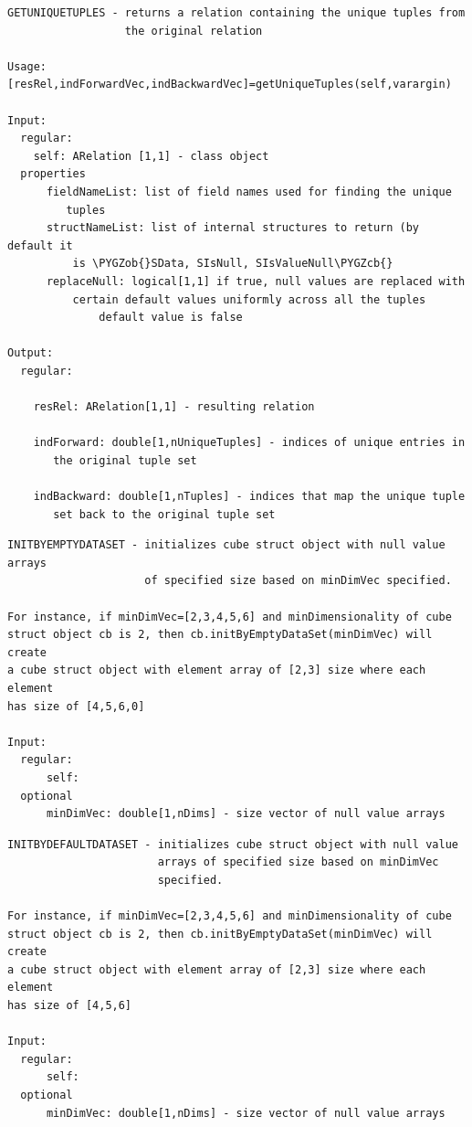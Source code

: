 \documentclass[letterpaper,10pt,english]{sphinxmanual}
\def\PYGZob{\char`\{}
\def\PYGZcb{\char`\}}
\begin{document}
\begin{Verbatim}[commandchars=\\\{\}]
GETUNIQUETUPLES - returns a relation containing the unique tuples from
                  the original relation

Usage: [resRel,indForwardVec,indBackwardVec]=getUniqueTuples(self,varargin)

Input:
  regular:
    self: ARelation [1,1] - class object
  properties
      fieldNameList: list of field names used for finding the unique
         tuples
      structNameList: list of internal structures to return (by default it
          is \PYGZob{}SData, SIsNull, SIsValueNull\PYGZcb{}
      replaceNull: logical[1,1] if true, null values are replaced with
          certain default values uniformly across all the tuples
              default value is false

Output:
  regular:

    resRel: ARelation[1,1] - resulting relation

    indForward: double[1,nUniqueTuples] - indices of unique entries in
       the original tuple set

    indBackward: double[1,nTuples] - indices that map the unique tuple
       set back to the original tuple set
\end{Verbatim}
\label{chap_func:smartdb-relations-atypifiedstaticrelation-initbyemptydataset}
\begin{Verbatim}[commandchars=\\\{\}]
INITBYEMPTYDATASET - initializes cube struct object with null value arrays
                     of specified size based on minDimVec specified.

For instance, if minDimVec=[2,3,4,5,6] and minDimensionality of cube
struct object cb is 2, then cb.initByEmptyDataSet(minDimVec) will create
a cube struct object with element array of [2,3] size where each element
has size of [4,5,6,0]

Input:
  regular:
      self:
  optional
      minDimVec: double[1,nDims] - size vector of null value arrays
\end{Verbatim}
\label{chap_func:smartdb-relations-atypifiedstaticrelation-initbydefaultdataset}
\begin{Verbatim}[commandchars=\\\{\}]
INITBYDEFAULTDATASET - initializes cube struct object with null value
                       arrays of specified size based on minDimVec
                       specified.

For instance, if minDimVec=[2,3,4,5,6] and minDimensionality of cube
struct object cb is 2, then cb.initByEmptyDataSet(minDimVec) will create
a cube struct object with element array of [2,3] size where each element
has size of [4,5,6]

Input:
  regular:
      self:
  optional
      minDimVec: double[1,nDims] - size vector of null value arrays
\end{Verbatim}
\end{document}
